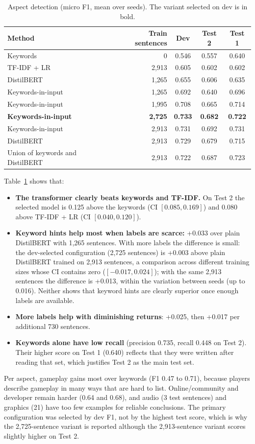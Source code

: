 \begin{table}[!htbp]
\centering
\caption{Aspect detection (micro F1, mean over seeds). The variant selected on dev is in bold.}
\label{tab:aspectdet}
\begin{tabular}{lrccc}
\toprule
\textbf{Method} & \textbf{Train sentences} & \textbf{Dev} & \textbf{Test 2} & \textbf{Test 1} \\
\midrule
Keywords & 0 & 0.546 & 0.557 & 0.640 \\
TF-IDF + LR & 2,913 & 0.605 & 0.602 & 0.602 \\
DistilBERT & 1,265 & 0.655 & 0.606 & 0.635 \\
Keywords-in-input & 1,265 & 0.692 & 0.640 & 0.696 \\
Keywords-in-input & 1,995 & 0.708 & 0.665 & 0.714 \\
\textbf{Keywords-in-input} & \textbf{2,725} & \textbf{0.733} & \textbf{0.682} & \textbf{0.722} \\
Keywords-in-input & 2,913 & 0.731 & 0.692 & 0.731 \\
DistilBERT & 2,913 & 0.729 & 0.679 & 0.715 \\
Union of keywords and DistilBERT & 2,913 & 0.722 & 0.687 & 0.723 \\
\bottomrule
\end{tabular}
\end{table}

Table~\ref{tab:aspectdet} shows that:
\begin{itemize}
    \item \textbf{The transformer clearly beats keywords and TF-IDF.} On Test 2 the selected model is 0.125 above the keywords (CI $[0.085, 0.169]$) and 0.080 above TF-IDF + LR (CI $[0.040, 0.120]$).
    \item \textbf{Keyword hints help most when labels are scarce:} +0.033 over plain DistilBERT with 1,265 sentences. With more labels the difference is small: the dev-selected configuration (2,725 sentences) is +0.003 above plain DistilBERT trained on 2,913 sentences, a comparison across different training sizes whose CI contains zero ($[-0.017, 0.024]$); with the same 2,913 sentences the difference is +0.013, within the variation between seeds (up to 0.016). Neither shows that keyword hints are clearly superior once enough labels are available.
    \item \textbf{More labels help with diminishing returns}: +0.025, then +0.017 per additional 730 sentences.
    \item \textbf{Keywords alone have low recall} (precision 0.735, recall 0.448 on Test 2). Their higher score on Test 1 (0.640) reflects that they were written after reading that set, which justifies Test 2 as the main test set.
\end{itemize}
Per aspect, gameplay gains most over keywords (F1 0.47 to 0.71), because players describe gameplay in many ways that are hard to list. Online/community and developer remain harder (0.64 and 0.68), and audio (3 test sentences) and graphics (21) have too few examples for reliable conclusions. The primary configuration was selected by dev F1, not by the highest test score, which is why the 2,725-sentence variant is reported although the 2,913-sentence variant scores slightly higher on Test 2.

